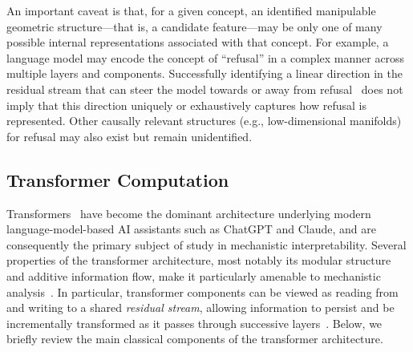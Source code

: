 An important caveat is that, for a given concept, an identified manipulable geometric structure---that is, a candidate feature---may be only one of many possible internal representations associated with that concept. For example, a language model may encode the concept of ``refusal'' in a complex manner across multiple layers and components. Successfully identifying a linear direction in the residual stream that can steer the model towards or away from refusal~ does not imply that this direction uniquely or exhaustively captures how refusal is represented. Other causally relevant structures (e.g., low-dimensional manifolds) for refusal may also exist but remain unidentified.

\subsection{Transformer Computation}
\label{subsec:transformers}

Transformers~ have become the dominant architecture underlying modern language-model-based AI assistants such as ChatGPT and Claude, and are consequently the primary subject of study in mechanistic interpretability. Several properties of the transformer architecture, most notably its modular structure and additive information flow, make it particularly amenable to mechanistic analysis~. In particular, transformer components can be viewed as reading from and writing to a shared \emph{residual stream}, allowing information to persist and be incrementally transformed as it passes through successive layers~. Below, we briefly review the main classical components of the transformer architecture.




